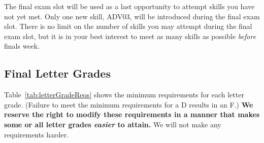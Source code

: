 
The final exam slot will be used as a last opportunity 
to attempt skills you have not yet met. 
Only one new skill, ADV03, will be introduced during the final exam slot. 
There is no limit on the number of skills 
you may attempt during the final exam slot, 
but it is in your best interest to meet 
as many skills as possible \emph{before} finals week. 

\subsection*{Final Letter Grades}
Table~\ref{tab:letterGradeReqs} shows 
the minimum requirements for each letter grade. 
(Failure to meet the minimum requirements for a D results in an F.) 
\textbf{We reserve the right to modify these requirements in a manner 
that makes some or all letter grades \emph{easier} to attain.} 
We will not make any requirements harder. 


